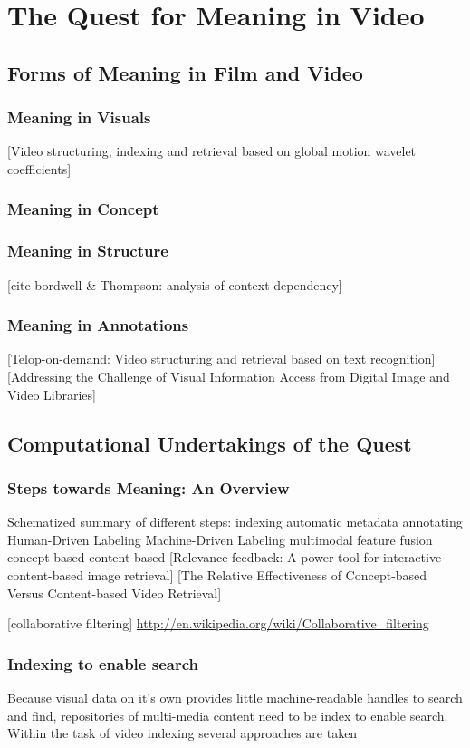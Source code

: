\chapter{The Quest for Meaning in Video}
\label{ch:quest}

\section{Forms of Meaning in Film and Video}

\subsection{Meaning in Visuals}
[Video structuring, indexing and retrieval based on global motion wavelet coefficients]\cite{Bruno:2002tt}


\subsection{Meaning in Concept}
\subsection{Meaning in Structure}
[cite bordwell \& Thompson: analysis of context dependency]

\subsection{Meaning in Annotations}
[Telop-on-demand: Video structuring and retrieval based on text recognition]\cite{Kuwano:2000wy}
[Addressing the Challenge of Visual Information Access from Digital Image and Video Libraries]\cite{Christel:2005td}

\section{Computational Undertakings of the Quest}

\subsection{Steps towards Meaning: An Overview}

Schematized summary of different steps:
indexing
automatic metadata
annotating
  Human-Driven Labeling
  Machine-Driven Labeling
multimodal feature fusion
concept based
content based [Relevance feedback: A power tool for interactive content-based image retrieval]\cite{Rui:1998uj}
[The Relative Effectiveness of Concept-based Versus Content-based Video Retrieval]\cite{Yang:2004tc}

[collaborative filtering] \url{http://en.wikipedia.org/wiki/Collaborative_filtering}

\subsection{Indexing to enable search}
Because visual data on it's own provides little machine-readable handles to search and find, repositories of multi-media content need to be index to enable search. Within the task of video indexing several approaches are taken 




